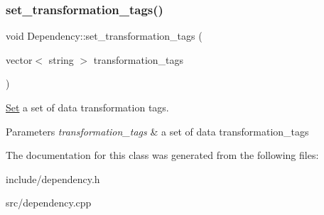 \subsubsection{\texorpdfstring{set\+\_\+transformation\+\_\+tags()}{set\_transformation\_tags()}}
{\footnotesize\ttfamily void Dependency\+::set\+\_\+transformation\+\_\+tags (\begin{DoxyParamCaption}\item[{vector$<$ string $>$}]{transformation\+\_\+tags }\end{DoxyParamCaption})}

\hyperlink{classSet}{Set} a set of data transformation tags. 
\begin{DoxyParams}{Parameters}
{\em transformation\+\_\+tags} & a set of data transformation\+\_\+tags \\
\hline
\end{DoxyParams}


The documentation for this class was generated from the following files\+:\begin{DoxyCompactItemize}
\item 
include/dependency.\+h\item 
src/dependency.\+cpp\end{DoxyCompactItemize}
